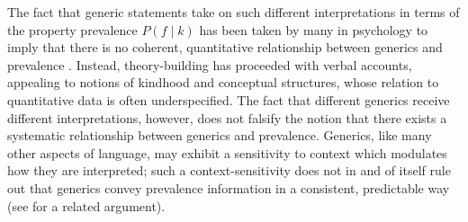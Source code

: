 \documentclass[floatsintext,doc]{apa6}
\begin{document}
The fact that generic statements take on such different interpretations in terms of the property prevalence $P(f \mid k)$ has been taken by many in psychology to imply that there is no coherent, quantitative relationship between generics and prevalence \cite{Leslie2008, Cimpian2010, Khemlani2012, Prasada2013}. 
Instead, theory-building has proceeded with verbal accounts, appealing to notions of kindhood and conceptual structures, whose relation to quantitative data is often underspecified.
The fact that different generics receive different interpretations, however, does not falsify the notion that there exists a systematic relationship between generics and prevalence.
Generics, like many other aspects of language, may exhibit a sensitivity to context  which  modulates how they are interpreted; such a context-sensitivity does not in and of itself rule out that generics convey prevalence information in a consistent, predictable way (see  for a related argument). 

\end{document}
